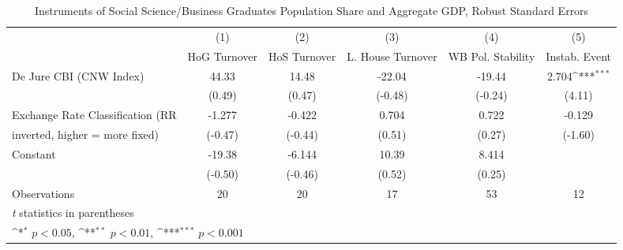 \begin{table}[htbp]\centering
\def\sym#1{\ifmmode^{#1}\else\(^{#1}\)\fi}
\caption{Instruments of Social Science/Business Graduates Population Share and Aggregate GDP, Robust Standard Errors \label{ifivs3}}
\begin{tabular}{l*{5}{c}}
\toprule
                                        &\multicolumn{1}{c}{(1)}&\multicolumn{1}{c}{(2)}&\multicolumn{1}{c}{(3)}&\multicolumn{1}{c}{(4)}&\multicolumn{1}{c}{(5)}\\
                                        &\multicolumn{1}{c}{HoG Turnover}&\multicolumn{1}{c}{HoS Turnover}&\multicolumn{1}{c}{L. House Turnover}&\multicolumn{1}{c}{WB Pol. Stability}&\multicolumn{1}{c}{Instab. Event}\\
\midrule
De Jure CBI (CNW Index)                 &    44.33         &    14.48         &   -22.04         &   -19.44         &    2.704\sym{***}\\
                                        &   (0.49)         &   (0.47)         &  (-0.48)         &  (-0.24)         &   (4.11)         \\
\addlinespace
Exchange Rate Classification (RR        &   -1.277         &   -0.422         &    0.704         &    0.722         &   -0.129         \\
inverted, higher = more fixed)          &  (-0.47)         &  (-0.44)         &   (0.51)         &   (0.27)         &  (-1.60)         \\
\addlinespace
Constant                                &   -19.38         &   -6.144         &    10.39         &    8.414         &                  \\
                                        &  (-0.50)         &  (-0.46)         &   (0.52)         &   (0.25)         &                  \\
\midrule
Observations                            &       20         &       20         &       17         &       53         &       12         \\
\bottomrule
\multicolumn{6}{l}{\footnotesize \textit{t} statistics in parentheses}\\
\multicolumn{6}{l}{\footnotesize \sym{*} \(p<0.05\), \sym{**} \(p<0.01\), \sym{***} \(p<0.001\)}\\
\end{tabular}
\end{table}
